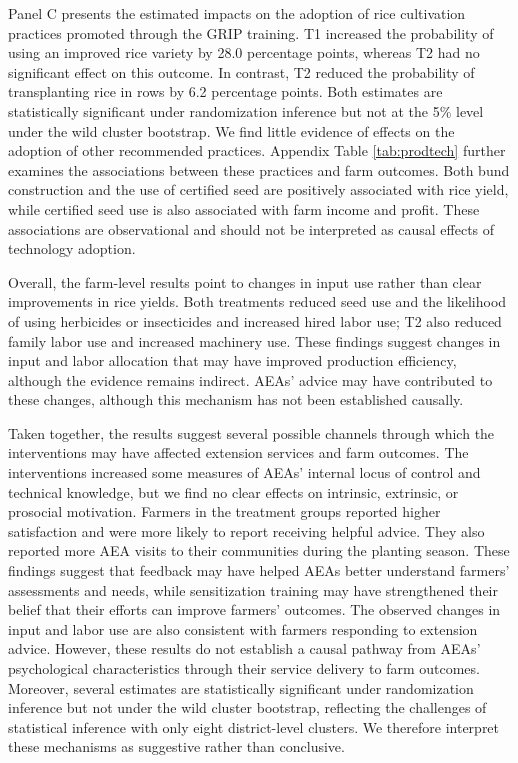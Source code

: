 \documentclass[11pt]{article}
\begin{document}
Panel C presents the estimated impacts on the adoption of rice cultivation practices promoted through the GRIP training. T1 increased the probability of using an improved rice variety by 28.0 percentage points, whereas T2 had no significant effect on this outcome. In contrast, T2 reduced the probability of transplanting rice in rows by 6.2 percentage points. Both estimates are statistically significant under randomization inference but not at the 5\% level under the wild cluster bootstrap. We find little evidence of effects on the adoption of other recommended practices. Appendix Table \ref{tab:prodtech} further examines the associations between these practices and farm outcomes. Both bund construction and the use of certified seed are positively associated with rice yield, while certified seed use is also associated with farm income and profit. These associations are observational and should not be interpreted as causal effects of technology adoption.

Overall, the farm-level results point to changes in input use rather than clear improvements in rice yields. Both treatments reduced seed use and the likelihood of using herbicides or insecticides and increased hired labor use; T2 also reduced family labor use and increased machinery use. These findings suggest changes in input and labor allocation that may have improved production efficiency, although the evidence remains indirect. AEAs’ advice may have contributed to these changes, although this mechanism has not been established causally.

Taken together, the results suggest several possible channels through which the interventions may have affected extension services and farm outcomes. The interventions increased some measures of AEAs’ internal locus of control and technical knowledge, but we find no clear effects on intrinsic, extrinsic, or prosocial motivation. Farmers in the treatment groups reported higher satisfaction and were more likely to report receiving helpful advice. They also reported more AEA visits to their communities during the planting season. These findings suggest that feedback may have helped AEAs better understand farmers' assessments and needs, while sensitization training may have strengthened their belief that their efforts can improve farmers' outcomes. The observed changes in input and labor use are also consistent with farmers responding to extension advice. However, these results do not establish a causal pathway from AEAs’ psychological characteristics through their service delivery to farm outcomes. Moreover, several estimates are statistically significant under randomization inference but not under the wild cluster bootstrap, reflecting the challenges of statistical inference with only eight district-level clusters. We therefore interpret these mechanisms as suggestive rather than conclusive. 
\end{document}
